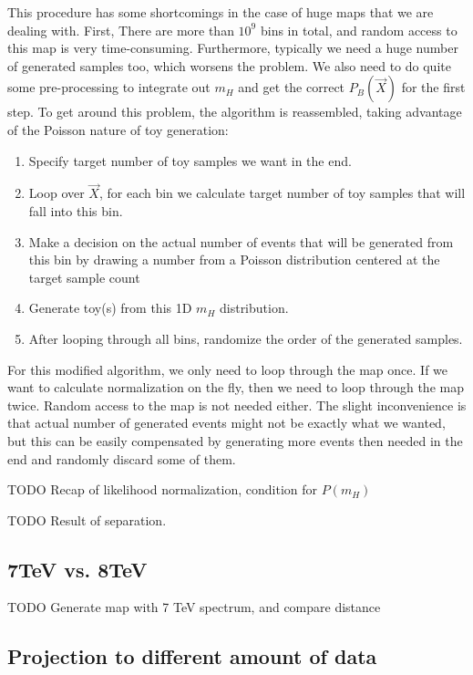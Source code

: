 \documentclass{cmspaper}
\begin{document}
This procedure has some shortcomings in the case of huge maps
that we are dealing with.  First, There are more than $10^9$
bins in total, and random access to this map is very time-consuming.
Furthermore, typically we need a huge number of generated samples too,
which worsens the problem.  We also need to do quite some pre-processing
to integrate out $m_H$ and get the correct $P_B(\vec{X})$
for the first step.  To get around this problem,
the algorithm is reassembled, taking advantage of the Poisson nature of
toy generation:

\begin{enumerate}
\item Specify target number of toy samples we want in the end.
\item Loop over $\vec{X}$, for each bin we calculate target number of toy samples that
will fall into this bin.
\item Make a decision on the actual number of events that will be generated from this bin by
drawing a number from a Poisson distribution centered at the target sample count
\item Generate toy(s) from this 1D $m_H$ distribution.
\item After looping through all bins, randomize the order of the generated samples.
\end{enumerate}

For this modified algorithm, we only need to loop through the map once.
If we want to calculate normalization on the fly, then we need to loop through the map twice.
Random access to the map is not needed either.  The slight
inconvenience is that actual number of generated events might not be exactly
what we wanted, but this can be easily compensated by generating more events
then needed in the end and randomly discard some of them.


TODO Recap of likelihood normalization, condition for $P(m_H)$

TODO Result of separation.

\subsection{7TeV vs. 8TeV}

TODO Generate map with 7 TeV spectrum, and compare distance

\subsection{Projection to different amount of data}
\end{document}
